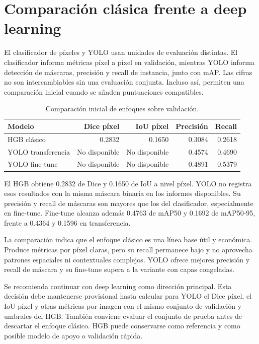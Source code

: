 \documentclass[11pt,a4paper]{article}
\begin{document}
\section{Comparación clásica frente a deep learning}

El clasificador de píxeles y YOLO usan unidades de evaluación distintas. El clasificador informa métricas píxel a píxel en validación, mientras YOLO informa detección de máscaras, precisión y recall de instancia, junto con mAP. Las cifras no son intercambiables sin una evaluación conjunta. Incluso así, permiten una comparación inicial cuando se añaden puntuaciones compatibles.

\begin{table}[H]
\centering
\small
\caption{Comparación inicial de enfoques sobre validación.}
\begin{tabular}{lrrrr}
\toprule
Modelo & Dice píxel & IoU píxel & Precisión & Recall\\
\midrule
HGB clásico & 0.2832 & 0.1650 & 0.3084 & 0.2618\\
YOLO transferencia & No disponible & No disponible & 0.4574 & 0.4690\\
YOLO fine-tune & No disponible & No disponible & 0.4891 & 0.5379\\
\bottomrule
\end{tabular}
\end{table}

El HGB obtiene 0.2832 de Dice y 0.1650 de IoU a nivel píxel. YOLO no registra esos resultados con la misma máscara binaria en los informes disponibles. Su precisión y recall de máscaras son mayores que los del clasificador, especialmente en fine-tune. Fine-tune alcanza además 0.4763 de mAP50 y 0.1692 de mAP50-95, frente a 0.4364 y 0.1596 en transferencia.

La comparación indica que el enfoque clásico es una línea base útil y económica. Produce métricas por píxel claras, pero su recall permanece bajo y no aprovecha patrones espaciales ni contextuales complejos. YOLO ofrece mejores precisión y recall de máscara y su fine-tune supera a la variante con capas congeladas.

Se recomienda continuar con deep learning como dirección principal. Esta decisión debe mantenerse provisional hasta calcular para YOLO el Dice píxel, el IoU píxel y otras métricas por imagen con el mismo conjunto de validación y umbrales del HGB. También conviene evaluar el conjunto de prueba antes de descartar el enfoque clásico. HGB puede conservarse como referencia y como posible modelo de apoyo o validación rápida.
\end{document}
